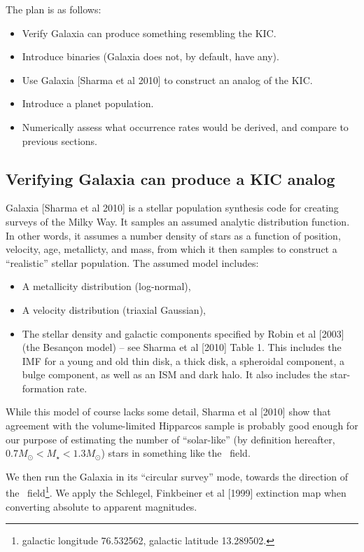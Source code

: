 \documentclass{emulateapj}
\begin{document}
The plan is as follows:
\begin{itemize}
	\item Verify Galaxia can produce something resembling the KIC.
	\item Introduce binaries (Galaxia does not, by default, have any).
	\item Use Galaxia [Sharma et al 2010] to construct an analog of the KIC.
	\item Introduce a planet population.
	\item Numerically assess what occurrence rates would be derived, and 
	compare to previous sections.
\end{itemize}

\subsection{Verifying Galaxia can produce a KIC analog }

Galaxia [Sharma et al 2010] is a stellar population synthesis code for creating 
surveys of the Milky Way. It samples an assumed analytic distribution function. 
In other words, it assumes a number density of stars as a function of position, 
velocity, age, metallicty, and mass, from which it then samples to construct a 
``realistic'' stellar population.
The assumed model includes:
\begin{itemize}
	\item A metallicity distribution (log-normal),
	\item A velocity distribution (triaxial Gaussian),
	\item The stellar density and galactic components specified by Robin et al 
	[2003] (the Besan\c{c}on model) -- see Sharma et al [2010] Table 1. This 
	includes the IMF for a young and old thin disk, a thick disk, a spheroidal 
	component, a bulge component, as well as an ISM and dark halo. It also 
	includes the star-formation rate.
\end{itemize}

While this model of course lacks some detail, Sharma et al [2010] show that 
agreement with the volume-limited Hipparcos sample is probably good enough for 
our purpose of estimating the number of ``solar-like'' (by definition 
hereafter, $0.7 M_\odot < M_\star < 1.3 M_\odot$) stars in something like the 
\kepler\ field.

We then run the Galaxia in its ``circular survey'' mode, towards the direction 
of the \kepler\ field\footnote{galactic longitude 76.532562, galactic latitude 
13.289502.}. We apply the Schlegel, Finkbeiner et al [1999] extinction map when 
converting absolute to apparent magnitudes.
\end{document}
